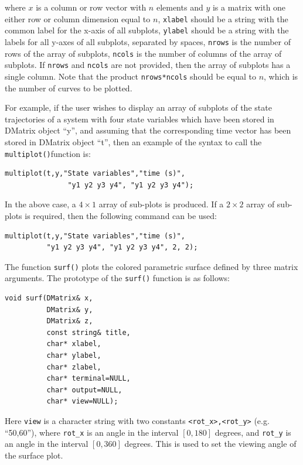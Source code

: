 \documentclass[a4paper,11pt]{report}    %
\newenvironment{shadedframe}{%
  \def\FrameCommand{\fcolorbox{black}{shadecolor}}%
  \MakeFramed {\FrameRestore}}
{\endMakeFramed}
\begin{document}
\noindent where $x$ is a column or row vector with $n$ elements and $y$ is a matrix with 
one either row or column dimension equal to $n$, \verb|xlabel| should be a string with the
common label for the x-axis of all subplots, \verb|ylabel| should be a string with the labels
for all y-axes of all subplots, separated by spaces, \verb|nrows| is the number of rows of the
array of subplots, \verb|ncols| is the number of columns of the array of subplots. If \verb|nrows|
and \verb|ncols| are not provided, then the array of subplots has a single column. Note that
the product \verb|nrows*ncols| should be equal to $n$, which is the number of curves to be plotted.


\begin{shadedframe}

For example, if the user wishes to display an array of subplots of the state trajectories of a system
with four state variables which have been stored in
DMatrix object ``y'', and assuming that the corresponding time vector has been stored in DMatrix object ``t'', 
then an example of the syntax to call the \texttt{multiplot()}function is:

\begin{verbatim}
multiplot(t,y,"State variables","time (s)", 
               "y1 y2 y3 y4", "y1 y2 y3 y4");
\end{verbatim}

In the above case, a $4 \times 1$ array of sub-plots is produced. If a $2 \times 2$ array of sub-plots is required,
then the following command can be used:

\begin{verbatim}
multiplot(t,y,"State variables","time (s)", 
          "y1 y2 y3 y4", "y1 y2 y3 y4", 2, 2);
\end{verbatim}


\end{shadedframe}



The function \texttt{surf()} plots the colored parametric surface defined by three matrix arguments. 
The prototype of the \texttt{surf()} function is as follows:

\begin{verbatim}
void surf(DMatrix& x, 
          DMatrix& y, 
          DMatrix& z, 
          const string& title, 
          char* xlabel, 
          char* ylabel, 
          char* zlabel, 
          char* terminal=NULL, 
          char* output=NULL,
          char* view=NULL); 
\end{verbatim}
Here \verb|view| is a character string with two constants \verb|<rot_x>,<rot_y>| (e.g. ``50,60''), where
\verb|rot_x| is an angle in the interval $[0,180]$ degrees, and \verb|rot_y| is an angle in the
interval $[0,360]$ degrees. This is used to set the viewing angle of the surface plot.
\end{document}
